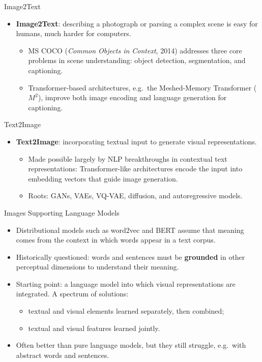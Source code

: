 \begin{frame}{Image2Text}
\begin{itemize}
  \item \textbf{Image2Text}: describing a photograph or parsing a complex scene is easy for humans, much harder for computers.
  \begin{itemize}
    \item MS COCO (\emph{Common Objects in Context}, 2014) addresses three core problems in scene understanding: object detection, segmentation, and captioning.
    \item Transformer-based architectures, e.g.\ the Meshed-Memory Transformer ($M^2$), improve both image encoding and language generation for captioning.
  \end{itemize}
\end{itemize}
\end{frame}

\begin{frame}{Text2Image}
\begin{itemize}
  \item \textbf{Text2Image}: incorporating textual input to generate visual representations.
  \begin{itemize}
    \item Made possible largely by NLP breakthroughs in contextual text representations: Transformer-like architectures encode the input into embedding vectors that guide image generation.
    \item Roots: GANs, VAEs, VQ-VAE, diffusion, and autoregressive models.
  \end{itemize}
\end{itemize}
\end{frame}

\begin{frame}{Images Supporting Language Models}
\begin{itemize}
  \item Distributional models such as word2vec and BERT assume that meaning comes from the context in which words appear in a text corpus.
  \item Historically questioned: words and sentences must be \textbf{grounded} in other perceptual dimensions to understand their meaning.
  \item Starting point: a language model into which visual representations are integrated. A spectrum of solutions:
  \begin{itemize}
    \item textual and visual elements learned separately, then combined;
    \item textual and visual features learned jointly.
  \end{itemize}
  \item Often better than pure language models, but they still struggle, e.g.\ with abstract words and sentences.
\end{itemize}
\end{frame}

